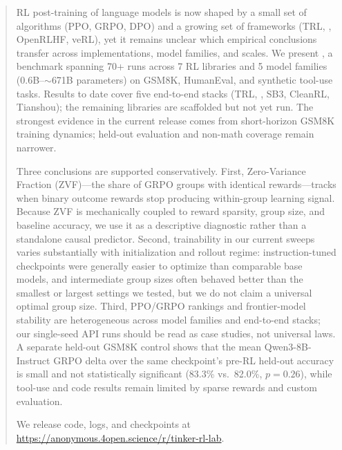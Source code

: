 \begin{abstract}
RL post-training of language models is now shaped by a small set of
algorithms (PPO, GRPO, DPO) and a growing set of frameworks (TRL,
\tinker{}, OpenRLHF, veRL), yet it remains unclear which empirical conclusions
transfer across implementations, model families, and scales. We present
\ours{}, a benchmark spanning 70+ runs across 7 RL libraries and 5 model
families (0.6B--$\sim$671B parameters) on GSM8K, HumanEval, and synthetic
tool-use tasks. Results to date cover five end-to-end stacks (TRL, \tinker{},
SB3, CleanRL, Tianshou); the remaining libraries are scaffolded but not yet run.
The strongest evidence in the current release comes
from short-horizon GSM8K training dynamics; held-out evaluation and non-math
coverage remain narrower.

Three conclusions are supported conservatively. First, Zero-Variance Fraction
(ZVF)---the share of GRPO groups with identical rewards---tracks when binary
outcome rewards stop producing within-group learning signal. Because ZVF is
mechanically coupled to reward sparsity, group size, and baseline accuracy, we
use it as a descriptive diagnostic rather than a standalone causal predictor.
Second, trainability in our current sweeps varies substantially with
initialization and rollout regime: instruction-tuned checkpoints were
generally easier to optimize than comparable base models, and intermediate
group sizes often behaved better than the smallest or largest settings we
tested, but we do not claim a universal optimal group size. Third, PPO/GRPO
rankings and frontier-model stability are heterogeneous across model families
and end-to-end stacks; our single-seed API runs should be read as case studies,
not universal laws. A separate held-out GSM8K control shows that the mean
Qwen3-8B-Instruct GRPO delta over the same checkpoint's pre-RL held-out accuracy
is small and not statistically significant (83.3\% vs.\ 82.0\%, $p{=}0.26$), while
tool-use and code results remain limited by sparse rewards and custom evaluation.

We release code, logs, and checkpoints at
\url{https://anonymous.4open.science/r/tinker-rl-lab}.
\end{abstract}
